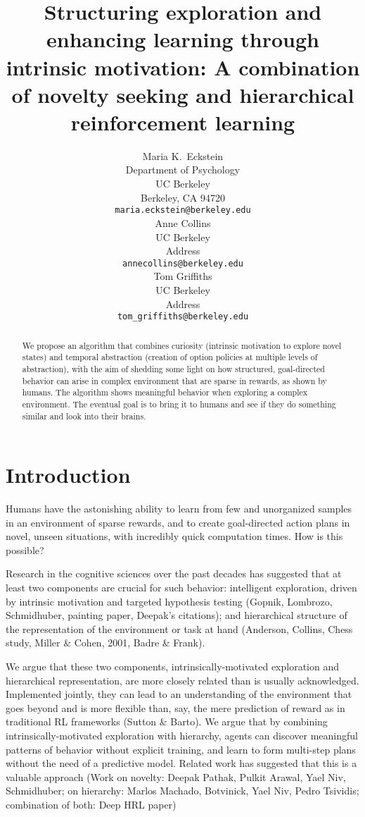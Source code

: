 \documentclass{article}
\title{Structuring exploration and enhancing learning through intrinsic motivation: A combination of novelty seeking and hierarchical reinforcement learning}
\author{
  Maria K.~Eckstein \\
  Department of Psychology \\
  UC Berkeley \\
  Berkeley, CA 94720 \\
  \texttt{maria.eckstein@berkeley.edu} \\  
  \And
  Anne Collins \\
  UC Berkeley \\
  Address \\
  \texttt{annecollins@berkeley.edu} \\
  \And
  Tom Griffiths \\
  UC Berkeley \\
  Address \\
  \texttt{tom_griffiths@berkeley.edu} \\
}
\begin{document}
\maketitle

\begin{abstract}
  We propose an algorithm that combines curiosity (intrinsic motivation to explore novel states) and temporal abstraction (creation of option policies at multiple levels of abstraction), with the aim of shedding some light on how structured, goal-directed behavior can arise in complex environment that are sparse in rewards, as shown by humans. The algorithm shows meaningful behavior when exploring a complex environment. The eventual goal is to bring it to humans and see if they do something similar and look into their brains.
\end{abstract}


\section{Introduction}

Humans have the astonishing ability to learn from few and unorganized samples in an environment of sparse rewards, and to create goal-directed action plans in novel, unseen situations, with incredibly quick computation times. How is this possible?

Research in the cognitive sciences over the past decades has suggested that at least two components are crucial for such behavior: intelligent exploration, driven by intrinsic motivation and targeted hypothesis testing (Gopnik, Lombrozo, Schmidhuber, painting paper, Deepak's citations); and hierarchical structure of the representation of the environment or task at hand (Anderson, Collins, Chess study, Miller \& Cohen, 2001, Badre \& Frank).

We argue that these two components, intrinsically-motivated exploration and hierarchical representation, are more closely related than is usually acknowledged. Implemented jointly, they can lead to an understanding of the environment that goes beyond and is more flexible than, say, the mere prediction of reward as in traditional RL frameworks (Sutton \& Barto). We argue that by combining intrinsically-motivated exploration with hierarchy, agents can discover meaningful patterns of behavior without explicit training, and learn to form multi-step plans without the need of a predictive model. Related work has suggested that this is a valuable approach (Work on novelty: Deepak Pathak, Pulkit Arawal, Yael Niv, Schmidhuber; on hierarchy: Marlos Machado, Botvinick, Yael Niv, Pedro Tsividis; combination of both: Deep HRL paper)
\end{document}
